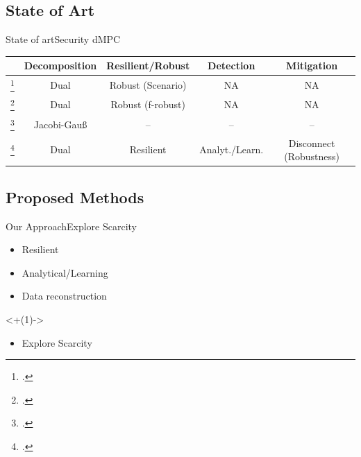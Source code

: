 \documentclass[aspectratio=169]{beamer}
\begin{document}
\subsection{State of Art}

\begin{frame}{State of art}{Security dMPC}
  \begin{table}[H]
      \begin{tabular}[h]{l!{\vrule}cccc}
        \toprule
        & Decomposition & Resilient/Robust & Detection & Mitigation\\
        \midrule
        \footcite{MaestreEtAl2021} & Dual &  Robust (Scenario) & NA & NA\\
        \footcite{VelardeEtAl2018} & Dual &  Robust (f-robust) & NA & NA\\
        {\footcite{ChanfreutEtAl2018}} & Jacobi-Gauß &  -- & -- & --\\
        \footcite{AnandutaEtAl2020} & Dual &  Resilient& Analyt./Learn. & Disconnect (Robustness)
        \\\bottomrule
      \end{tabular}
  \end{table}
\end{frame}

\subsection{Proposed Methods}

\begin{frame}{Our Approach}{Explore Scarcity}
  \begin{itemize}
    \item Resilient
    \item Analytical/Learning
    \item Data reconstruction
  \end{itemize}

  \onslide<+(1)->{
  }

  \vspace{.5cm}
  \begin{itemize}[<+(1)->]
    \item Explore Scarcity
  \end{itemize}
\end{frame}
\end{document}
